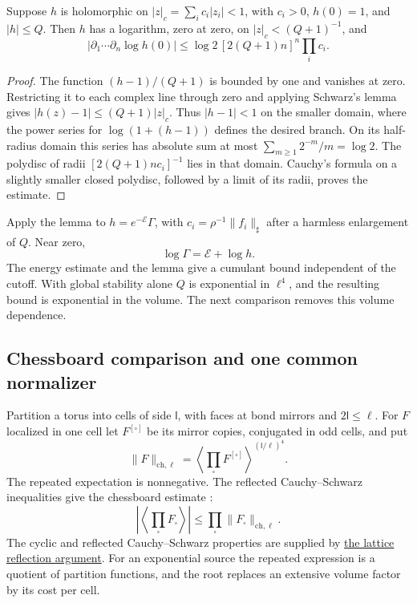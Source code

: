\documentclass[11pt,letterpaper,reqno]{amsart}
\makeatletter
\theoremstyle{definition}
\newcommand{\ms@minorstart}{%
  \pushQED{\qed}\renewcommand{\qedsymbol}{$\blacksquare$}}
\newenvironment{lemma}[1][]{\ms@minorstart\ms@lemma[#1]}
  {\popQED\endms@lemma}
\theoremstyle{remark}
\makeatother
\begin{document}
\begin{lemma}[A local logarithm estimate]\label{lem:source-logarithm}
Suppose $h$ is holomorphic on $|z|_c=\sum_ic_i|z_i|<1$, with
$c_i>0$, $h(0)=1$, and $|h|\le Q$. Then $h$ has a logarithm, zero at
zero, on $|z|_c<(Q+1)^{-1}$, and
\[
 |\partial_1\cdots\partial_n\log h(0)|
       \le\log2\,[2(Q+1)n]^n\prod_ic_i.
\]
\end{lemma}

\begin{proof}
The function $(h-1)/(Q+1)$ is bounded by one and vanishes at zero.
Restricting it to each complex line through zero and applying Schwarz's
lemma gives $|h(z)-1|\le(Q+1)|z|_c$. Thus $|h-1|<1$ on the smaller
domain, where the power series for $\log(1+(h-1))$ defines the desired
branch. On its half-radius domain this series has absolute sum at most
$\sum_{m\ge1}2^{-m}/m=\log2$. The polydisc of radii
$[2(Q+1)nc_i]^{-1}$ lies in that domain. Cauchy's formula on a slightly
smaller closed polydisc, followed by a limit of its radii, proves the
estimate.
\end{proof}

Apply the lemma to $h=e^{-\mathcal E}\Gamma$, with
$c_i=\rho^{-1}\|f_i\|_\sharp$ after a harmless enlargement of $Q$.
Near zero,
\[
 \log\Gamma=\mathcal E+\log h.
\]
The energy estimate and the lemma give a cumulant bound independent of
the cutoff. With global stability alone $Q$ is exponential in $\ell^4$,
and the resulting bound is exponential in the volume. The next
comparison removes this volume dependence.

\subsection{Chessboard comparison and one common normalizer}

Partition a torus into cells of side $\mathsf l$, with faces at bond
mirrors and $2\mathsf l\le\ell$. For $F$ localized in one cell let
$F^{[\square]}$ be its mirror copies, conjugated in odd cells, and put
\[
 \|F\|_{\mathrm{ch},\ell}
  =\left\langle\prod_\square F^{[\square]}\right\rangle^{(\mathsf l/\ell)^4}.
\]
The repeated expectation is nonnegative. The reflected
Cauchy--Schwarz inequalities give the chessboard estimate
\cite[Theorems~4.1--4.3]{FILS1978}:
\[
 \left|\left\langle\prod_\square F_\square\right\rangle\right|
          \le\prod_\square\|F_\square\|_{\mathrm{ch},\ell}.
\]
The cyclic and reflected Cauchy--Schwarz properties are supplied by
\hyperref[hyp:gibbs-reflections]{the lattice reflection argument}. For an exponential source the repeated
expression is a quotient of partition functions, and the root replaces
an extensive volume factor by its cost per cell.
\end{document}
